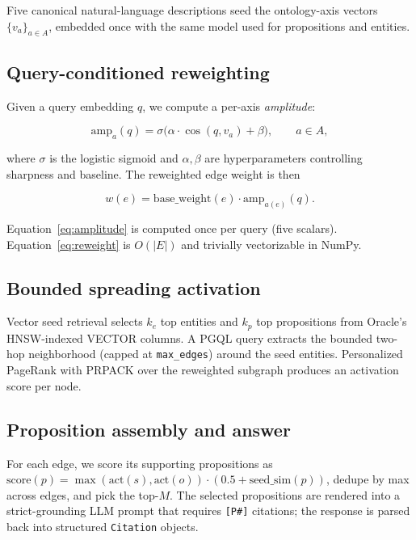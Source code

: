 \documentclass{article}
\begin{document}
Five canonical natural-language descriptions seed the ontology-axis
vectors $\{v_a\}_{a \in A}$, embedded once with the same model used for
propositions and entities.

\subsection{Query-conditioned reweighting}
\label{sec:method-reweighting}

Given a query embedding $q$, we compute a per-axis \emph{amplitude}:

\begin{equation}
\mathrm{amp}_a(q) = \sigma\bigl(\alpha \cdot \cos(q, v_a) + \beta\bigr),
\qquad a \in A,
\label{eq:amplitude}
\end{equation}

where $\sigma$ is the logistic sigmoid and $\alpha, \beta$ are hyperparameters
controlling sharpness and baseline. The reweighted edge weight is then

\begin{equation}
w(e) = \mathrm{base\_weight}(e) \cdot \mathrm{amp}_{a(e)}(q).
\label{eq:reweight}
\end{equation}

Equation~\ref{eq:amplitude} is computed once per query (five scalars).
Equation~\ref{eq:reweight} is $O(|E|)$ and trivially vectorizable in NumPy.

\subsection{Bounded spreading activation}
\label{sec:method-spreading}

Vector seed retrieval selects $k_e$ top entities and $k_p$ top
propositions from Oracle's HNSW-indexed VECTOR columns. A PGQL query
extracts the bounded two-hop neighborhood (capped at \texttt{max\_edges})
around the seed entities. Personalized PageRank with PRPACK
\citep{prpack} over the reweighted subgraph produces an activation score
per node.

\subsection{Proposition assembly and answer}
\label{sec:method-assembly}

For each edge, we score its supporting propositions as
$\mathrm{score}(p) = \max(\mathrm{act}(s), \mathrm{act}(o)) \cdot
(0.5 + \mathrm{seed\_sim}(p))$, dedupe by max across edges, and pick
the top-$M$. The selected propositions are rendered into a strict-grounding
LLM prompt that requires \texttt{[P\#]} citations; the response is parsed
back into structured \texttt{Citation} objects.
\end{document}
